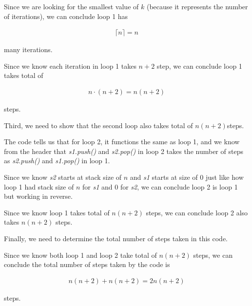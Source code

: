 \documentclass[12pt]{article}
\begin{document}
\begin{enumerate}[a.]
\begin{mdframed}
    \bigskip

    Since we are looking for the smallest value of $k$ (because it represents
    the number of iterations), we can conclude loop 1 has

    \begin{align}
        \lceil n \rceil = n
    \end{align}

    many iterations.

    \bigskip

    Since we know each iteration in loop 1 takes $n+2$ step, we can conclude
    loop 1 takes total of

    \begin{align}
        n \cdot (n+2) = n(n+2)
    \end{align}

    steps.

    \bigskip

    Third, we need to show that the second loop also takes total of \color{red}$n(n+2)$\color{black}\:steps.

    \bigskip
    \color{red}
    The code tells us that for loop 2, it functions the same as loop 1, and we
    know from the header that \textit{s1.push()} and \textit{s2.pop()} in loop 2
    takes the number of steps as \textit{s2.push()} and \textit{s1.pop()} in loop 1.

    \bigskip

    Since we know \textit{s2} starts at stack size of $n$ and \textit{s1} starts at size of 0
    just like how loop 1 had stack size of $n$ for \textit{s1} and
    0 for \textit{s2}, we can conclude loop 2 is loop 1 but working in reverse.

    \bigskip

    Since we know loop 1 takes total of $n(n+2)$ steps, we can conclude loop 2
    also takes $n(n+2)$ steps.
    \color{black}

    \bigskip

    Finally, we need to determine the total number of steps taken in this code.

    \bigskip

    Since \color{red}we know both loop 1 and loop 2 take total of $n(n+2)$ steps,\color{black}\:
    we can conclude the total number of steps taken by the code is

    \color{red}
    \begin{align}
        n(n+2) + n(n+2) = 2n(n+2)
    \end{align}
    \color{black}

    steps.


    \end{mdframed}

\end{enumerate}
\end{document}
